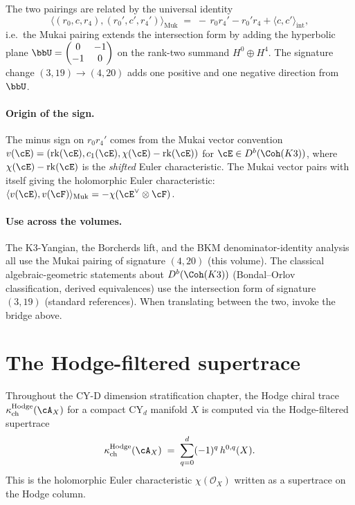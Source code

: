 The two pairings are related by the universal identity
\[
 \boxed{\;\langle (r_0, c, r_4), (r_0', c', r_4') \rangle_{\mathrm{Muk}}
 \;=\; -\, r_0 r_4' - r_0' r_4 + \langle c, c' \rangle_{\mathrm{int}},\;}
\]
i.e.\ the Mukai pairing extends the intersection form by adding the
hyperbolic plane $\bbU = \begin{pmatrix} 0 & -1 \\ -1 & 0 \end{pmatrix}$
on the rank-two summand $H^0 \oplus H^4$. The signature change
$(3, 19) \to (4, 20)$ adds one positive and one negative direction from
$\bbU$.

\paragraph{Origin of the sign.}
The minus sign on $r_0 r_4'$ comes from the Mukai vector convention
$v(\cE) = (\mathrm{rk}(\cE), c_1(\cE), \chi(\cE) - \mathrm{rk}(\cE))$ for
$\cE \in D^b(\Coh(K3))$, where $\chi(\cE) - \mathrm{rk}(\cE)$ is the
\emph{shifted} Euler characteristic. The Mukai vector pairs with itself
giving the holomorphic Euler characteristic:
$\langle v(\cE), v(\cF) \rangle_{\mathrm{Muk}} = -\chi(\cE^\vee \otimes \cF)$.

\paragraph{Use across the volumes.}
The K3-Yangian, the Borcherds lift, and the BKM denominator-identity
analysis all use the Mukai pairing of signature $(4, 20)$ \textup{(}this
volume\textup{).} The classical algebraic-geometric statements about
$D^b(\Coh(K3))$ (Bondal--Orlov classification, derived equivalences) use
the intersection form of signature $(3, 19)$ \textup{(}standard
references\textup{).} When translating between the two, invoke the bridge
above.


\section{The Hodge-filtered supertrace}
\label{sec:hodge-filtered-supertrace}

Throughout the CY-D dimension stratification chapter, the Hodge chiral trace
$\kappa_{\mathrm{ch}}^{\mathrm{Hodge}}(\cA_X)$ for a compact CY$_d$ manifold $X$ is computed
via the Hodge-filtered supertrace
\[
 \kappa_{\mathrm{ch}}^{\mathrm{Hodge}}(\cA_X) \;=\; \sum_{q = 0}^{d} (-1)^q\, h^{0, q}(X).
\]
This is the holomorphic Euler characteristic $\chi(\mathcal{O}_X)$
written as a supertrace on the Hodge column.

